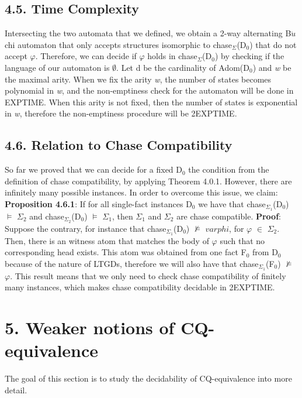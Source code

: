 \documentclass[11pt, a4paper, dvipsnames]{article}
\begin{document}
\subsection{4.5. Time Complexity}
Intersecting the two automata that we defined, we obtain a 2-way alternating B$\ddot{u}$chi automaton that only accepts structures isomorphic to chase$_{\Sigma}$(D$_{0}$) that do not accept $\varphi$. Therefore, we can decide if $\varphi$ holds in chase$_{\Sigma}$(D$_{0}$) by checking if the language of our automaton is $\emptyset$.\newline
Let d be the cardinality of Adom(D$_{0}$) and \textit{w} be the maximal arity. When we fix the arity \textit{w}, the number of states becomes polynomial in \textit{w}, and the non-emptiness check for the automaton will be done in EXPTIME. When this arity is not fixed, then the number of states is exponential in \textit{w}, therefore the non-emptiness procedure will be 2EXPTIME.

\subsection{4.6. Relation to Chase Compatibility}
So far we proved that we can decide for a fixed D$_{0}$ the condition from the definition of chase compatibility, by applying Theorem 4.0.1. However, there are infinitely many possible instances. In order to overcome this issue, we claim:\newline
\textbf{Proposition 4.6.1}: If for all single-fact instances D$_{0}$ we have that chase$_{\Sigma_{1}}$(D$_{0}$) $\vDash$ $\Sigma_{2}$ and chase$_{\Sigma_{2}}$(D$_{0}$) $\vDash$ $\Sigma_{1}$, then $\Sigma_{1}$ and $\Sigma_{2}$ are chase compatible.\newline
\textbf{Proof}: Suppose the contrary, for instance that chase$_{\Sigma_{1}}$(D$_{0}$) $\nvDash$ $varphi$, for $\varphi$ $\in$ $\Sigma_{2}$. Then, there is an witness atom that matches the body of $\varphi$ such that no corresponding head exists. This atom was obtained from one fact F$_{0}$ from D$_{0}$ because of the nature of LTGDs, therefore we will also have that chase$_{\Sigma_{1}}$(F$_{0}$) $\nvDash$ $\varphi$. \newline
This result means that we only need to check chase compatibility of finitely many instances, which makes chase compatibility decidable in 2EXPTIME.

\newpage

\section{5. Weaker notions of CQ-equivalence}
The goal of this section is to study the decidability of CQ-equivalence into more detail.
\end{document}
